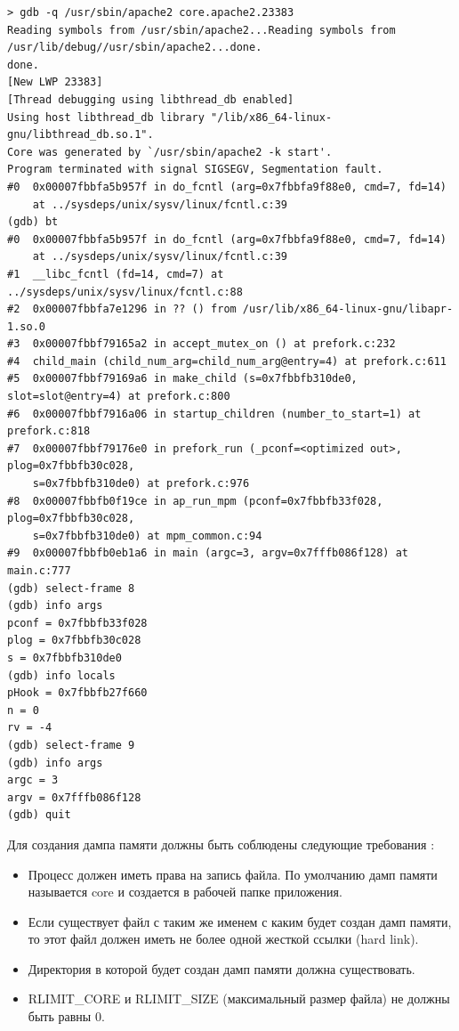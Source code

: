 \documentclass[20pt]{article}
\begin{document}
\begin{lstlisting}[caption={Анализ дампа памяти в gdb},label={gdb-core-dump}]
> gdb -q /usr/sbin/apache2 core.apache2.23383
Reading symbols from /usr/sbin/apache2...Reading symbols from /usr/lib/debug//usr/sbin/apache2...done.
done.
[New LWP 23383]
[Thread debugging using libthread_db enabled]
Using host libthread_db library "/lib/x86_64-linux-gnu/libthread_db.so.1".
Core was generated by `/usr/sbin/apache2 -k start'.
Program terminated with signal SIGSEGV, Segmentation fault.
#0  0x00007fbbfa5b957f in do_fcntl (arg=0x7fbbfa9f88e0, cmd=7, fd=14)
    at ../sysdeps/unix/sysv/linux/fcntl.c:39
(gdb) bt
#0  0x00007fbbfa5b957f in do_fcntl (arg=0x7fbbfa9f88e0, cmd=7, fd=14)
    at ../sysdeps/unix/sysv/linux/fcntl.c:39
#1  __libc_fcntl (fd=14, cmd=7) at ../sysdeps/unix/sysv/linux/fcntl.c:88
#2  0x00007fbbfa7e1296 in ?? () from /usr/lib/x86_64-linux-gnu/libapr-1.so.0
#3  0x00007fbbf79165a2 in accept_mutex_on () at prefork.c:232
#4  child_main (child_num_arg=child_num_arg@entry=4) at prefork.c:611
#5  0x00007fbbf79169a6 in make_child (s=0x7fbbfb310de0, slot=slot@entry=4) at prefork.c:800
#6  0x00007fbbf7916a06 in startup_children (number_to_start=1) at prefork.c:818
#7  0x00007fbbf79176e0 in prefork_run (_pconf=<optimized out>, plog=0x7fbbfb30c028,
    s=0x7fbbfb310de0) at prefork.c:976
#8  0x00007fbbfb0f19ce in ap_run_mpm (pconf=0x7fbbfb33f028, plog=0x7fbbfb30c028,
    s=0x7fbbfb310de0) at mpm_common.c:94
#9  0x00007fbbfb0eb1a6 in main (argc=3, argv=0x7fffb086f128) at main.c:777
(gdb) select-frame 8
(gdb) info args
pconf = 0x7fbbfb33f028
plog = 0x7fbbfb30c028
s = 0x7fbbfb310de0
(gdb) info locals
pHook = 0x7fbbfb27f660
n = 0
rv = -4
(gdb) select-frame 9
(gdb) info args
argc = 3
argv = 0x7fffb086f128
(gdb) quit
\end{lstlisting}

Для создания дампа памяти должны быть соблюдены следующие требования \cite{man/coredump}:
\begin{itemize}
  \item Процесс должен иметь права на запись файла. По умолчанию дамп памяти
  называется core и создается в рабочей папке приложения.
  \item Если существует файл с таким же именем с каким будет создан дамп памяти,
  то этот файл должен иметь не более одной жесткой ссылки (hard link).
  \item Директория в которой будет создан дамп памяти должна существовать.
  \item RLIMIT\_CORE и RLIMIT\_SIZE (максимальный размер файла) не должны быть равны 0.
\end{itemize}
\end{document}

